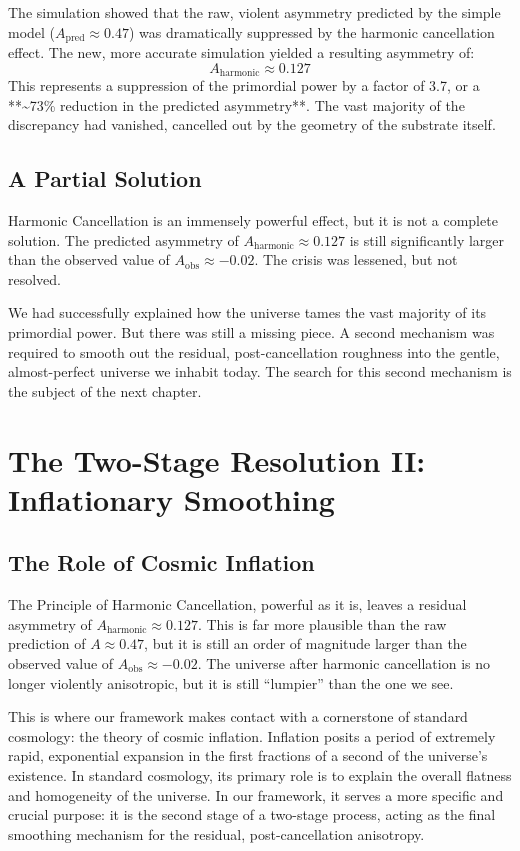 \documentclass[12pt]{report}
\begin{document}
The simulation showed that the raw, violent asymmetry predicted by the simple model ($A_{\text{pred}} \approx 0.47$) was dramatically suppressed by the harmonic cancellation effect. The new, more accurate simulation yielded a resulting asymmetry of:
\begin{equation}
A_{\text{harmonic}} \approx 0.127
\end{equation}
This represents a suppression of the primordial power by a factor of 3.7, or a **\textasciitilde73\% reduction in the predicted asymmetry**. The vast majority of the discrepancy had vanished, cancelled out by the geometry of the substrate itself.

\section{A Partial Solution}
Harmonic Cancellation is an immensely powerful effect, but it is not a complete solution. The predicted asymmetry of $A_{\text{harmonic}} \approx 0.127$ is still significantly larger than the observed value of $A_{\text{obs}} \approx -0.02$. The crisis was lessened, but not resolved.

We had successfully explained how the universe tames the vast majority of its primordial power. But there was still a missing piece. A second mechanism was required to smooth out the residual, post-cancellation roughness into the gentle, almost-perfect universe we inhabit today. The search for this second mechanism is the subject of the next chapter.

\chapter{The Two-Stage Resolution II: Inflationary Smoothing}

\section{The Role of Cosmic Inflation}
The Principle of Harmonic Cancellation, powerful as it is, leaves a residual asymmetry of $A_{\text{harmonic}} \approx 0.127$. This is far more plausible than the raw prediction of $A \approx 0.47$, but it is still an order of magnitude larger than the observed value of $A_{\text{obs}} \approx -0.02$. The universe after harmonic cancellation is no longer violently anisotropic, but it is still ``lumpier'' than the one we see.

This is where our framework makes contact with a cornerstone of standard cosmology: the theory of cosmic inflation. Inflation posits a period of extremely rapid, exponential expansion in the first fractions of a second of the universe's existence. In standard cosmology, its primary role is to explain the overall flatness and homogeneity of the universe. In our framework, it serves a more specific and crucial purpose: it is the second stage of a two-stage process, acting as the final smoothing mechanism for the residual, post-cancellation anisotropy.
\end{document}
